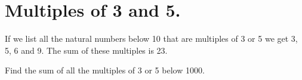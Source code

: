 \documentclass[a4paper,11pt]{article}
\begin{document}
\section{Multiples of 3 and 5.}
If we list all the natural numbers below 10 that are multiples of 3 or 5 we get 3, 5, 6 and 9. The sum of these multiples is 23.

Find the sum of all the multiples of 3 or 5 below 1000.
\end{document}
